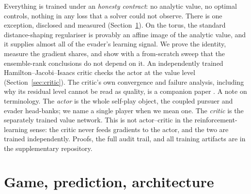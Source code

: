 \documentclass[twoside,11pt]{article}
\begin{document}
Everything is trained under an \emph{honesty contract}: no analytic
value, no optimal controls, nothing in any loss that a solver could
not observe.  There is one exception, disclosed and measured
(Section~\ref{sec:setup}).  On the torus, the standard
distance-shaping regulariser is provably an affine image of the
analytic value, and it supplies almost all of the evader's learning
signal.  We prove the identity, measure the gradient shares, and show
with a from-scratch sweep that the ensemble-rank conclusions do not
depend on it.  An independently trained Hamilton--Jacobi--Isaacs
critic checks the actor at the value level (Section~\ref{sec:critic}).
The critic's own convergence and failure analysis, including why its
residual level cannot be read as quality, is a companion paper
\citep{companion2026critics}.  A note on terminology.  The \emph{actor}
is the whole self-play object, the coupled pursuer and evader
head-banks; we name a single player when we mean one.  The
\emph{critic} is the separately trained value network.  This is not
actor--critic in the reinforcement-learning sense: the critic never
feeds gradients to the actor, and the two are trained independently.
Proofs, the full audit trail, and all training artifacts are in the
supplementary repository.

\section{Game, prediction, architecture}
\label{sec:setup}
\end{document}
